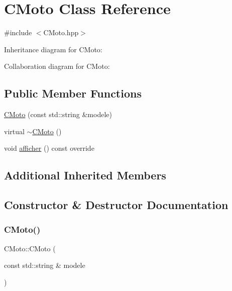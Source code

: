 \hypertarget{classCMoto}{}\section{C\+Moto Class Reference}
\label{classCMoto}


{\ttfamily \#include $<$C\+Moto.\+hpp$>$}



Inheritance diagram for C\+Moto\+:


Collaboration diagram for C\+Moto\+:
\subsection*{Public Member Functions}
\begin{DoxyCompactItemize}
\item 
\hyperlink{classCMoto_aa3faf4b270647713bd6cf004bb47c854}{C\+Moto} (const std\+::string \&modele)
\item 
virtual \hyperlink{classCMoto_a2c14900e72b48a041b708f114c13aba0}{$\sim$\+C\+Moto} ()
\item 
void \hyperlink{classCMoto_a37389934d10714c39386335eb31381e1}{afficher} () const override
\end{DoxyCompactItemize}
\subsection*{Additional Inherited Members}


\subsection{Constructor \& Destructor Documentation}
\mbox{\label{classCMoto_aa3faf4b270647713bd6cf004bb47c854}} 
\subsubsection{\texorpdfstring{C\+Moto()}{CMoto()}}
{\footnotesize\ttfamily C\+Moto\+::\+C\+Moto (\begin{DoxyParamCaption}\item[{const std\+::string \&}]{modele }\end{DoxyParamCaption})}

\mbox{\label{classCMoto_a2c14900e72b48a041b708f114c13aba0}} 
